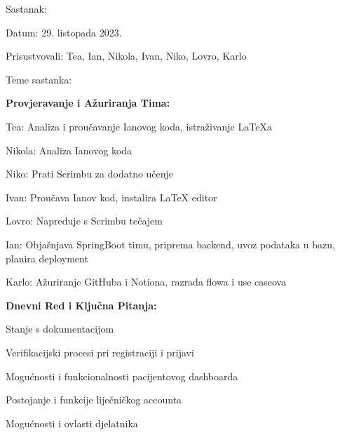 \begin{packed_enum}
        \item Sastanak: 
            \item[] \begin{packed_item}
                \item Datum: 29. listopada 2023.
                \item Prisustvovali: Tea, Ian, Nikola, Ivan, Niko, Lovro, Karlo
                \item Teme sastanka:
                    \begin{packed_item}
                        \item \textbf{Provjeravanje i Ažuriranja Tima:}
                            \begin{packed_item}
                                \item Tea: Analiza i proučavanje Ianovog koda, istraživanje LaTeXa
                                \item Nikola: Analiza Ianovog koda
                                \item Niko: Prati Scrimbu za dodatno učenje
                                \item Ivan: Proučava Ianov kod, instalira LaTeX editor
                                \item Lovro: Napreduje s Scrimbu tečajem
                                \item Ian: Objašnjava SpringBoot timu, priprema backend, uvoz podataka u bazu, planira deployment
                                \item Karlo: Ažuriranje GitHuba i Notiona, razrada flowa i use caseova
                            \end{packed_item}
                        \item \textbf{Dnevni Red i Ključna Pitanja:}
                            \begin{packed_item}
                                \item Stanje s dokumentacijom
                                \item Verifikacijski procesi pri registraciji i prijavi
                                \item Mogućnosti i funkcionalnosti pacijentovog dashboarda
                                \item Postojanje i funkcije liječničkog accounta
                                \item Mogućnosti i ovlasti djelatnika
                            \end{packed_item}

\end{packed_item}
\end{packed_item}
\end{packed_enum}
